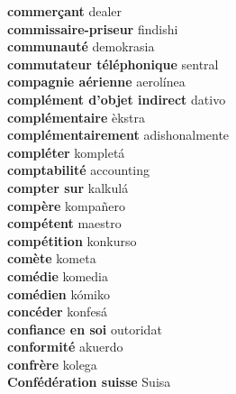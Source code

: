 \textbf{ commerçant  } dealer \\
\textbf{ commissaire-priseur  } findishi \\
\textbf{ communauté  } demokrasia \\
\textbf{ commutateur téléphonique  } sentral \\
\textbf{ compagnie aérienne  } aerolínea \\
\textbf{ complément d’objet indirect  } dativo \\
\textbf{ complémentaire  } èkstra \\
\textbf{ complémentairement  } adishonalmente \\
\textbf{ compléter  } kompletá \\
\textbf{ comptabilité  } accounting \\
\textbf{ compter sur  } kalkulá \\
\textbf{ compère  } kompañero \\
\textbf{ compétent  } maestro \\
\textbf{ compétition  } konkurso \\
\textbf{ comète  } kometa \\
\textbf{ comédie  } komedia \\
\textbf{ comédien  } kómiko \\
\textbf{ concéder  } konfesá \\
\textbf{ confiance en soi  } outoridat \\
\textbf{ conformité  } akuerdo \\
\textbf{ confrère  } kolega \\
\textbf{ Confédération suisse  } Suisa \\
